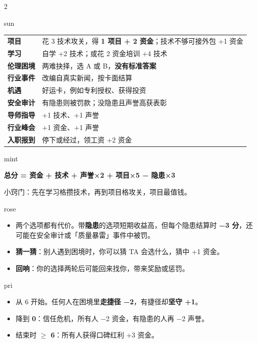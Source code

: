 \documentclass[10pt]{article}
\begin{document}
\begin{multicols}{2}
\begin{card}{sun}
\footnotesize
\renewcommand{\arraystretch}{1.12}
\begin{tabularx}{\linewidth}{@{}>{\bfseries}l X@{}}
项目 & 花 3 技术攻关，得 \textbf{1 项目 + 2 资金}；技术不够可接外包 +1 资金\\
学习 & 自学 +2 技术；或花 2 资金培训 +4 技术\\
伦理困境 & 两难抉择，选 A 或 B，\textbf{没有标准答案}\\
行业事件 & 改编自真实新闻，按卡面结算\\
机遇 & 好运卡，例如专利授权、获得投资\\
安全审计 & 有隐患则被罚款；没隐患且声誉高获表彰\\
导师指导 & +1 技术、+1 声誉\\
行业峰会 & +1 资金、+1 声誉\\
入职报到 & 停下或经过，领工资 +2 资金
\end{tabularx}
\end{card}

\begin{card}{mint}
\small
\begin{center}
\textbf{总分 = 资金 + 技术 + 声誉×2 + 项目×5 − 隐患×3}
\end{center}
\footnotesize 小窍门：先在学习格攒技术，再到项目格攻关，项目最值钱。
\end{card}

\begin{card}{rose}
\small
\begin{itemize}
\item 两个选项都有代价。带\textbf{\color{bad}隐患}的选项短期收益高，但每个隐患结算时 \textbf{−3 分}，还可能在安全审计或「质量暴雷」事件中被罚。
\item \textbf{猜一猜}：别人遇到困境时，你可以猜 TA 会选什么，猜中 +1 资金。
\item \textbf{回响}：你的选择两轮后可能回来找你，带来奖励或惩罚。
\end{itemize}
\end{card}

\begin{card}{pri}
\small
\begin{itemize}
\item 从 6 开始。任何人在困境里\textbf{走捷径 −2}，有捷径却\textbf{坚守 +1}。
\item 降到 \textbf{0}：信任危机，所有人 −2 资金，有隐患的人再 −2 声誉。
\item 结束时 \textbf{$\ge$ 6}：所有人获得口碑红利 +3 资金。
\end{itemize}
\end{card}
\end{multicols}
\end{document}
